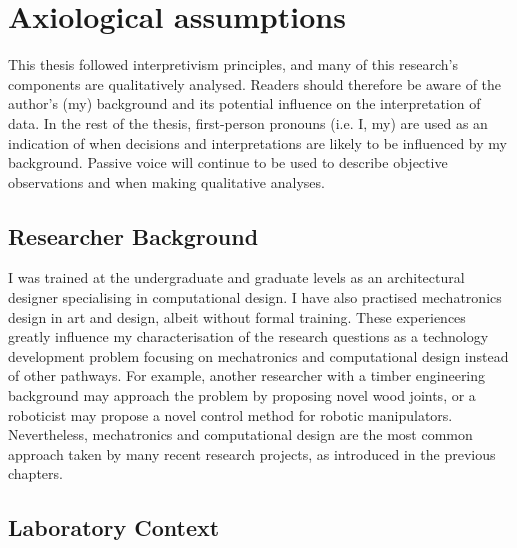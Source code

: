 \section{Axiological assumptions}
\label{section:methodology_axiological_assumptions}

This thesis followed interpretivism principles, and many of this research's components are qualitatively analysed. Readers should therefore be aware of the author’s (my) background and its potential influence on the interpretation of data. In the rest of the thesis, first-person pronouns (i.e. I, my) are used as an indication of when decisions and interpretations are likely to be influenced by my background. Passive voice will continue to be used to describe objective observations and when making qualitative analyses.

\subsection{Researcher Background}
\label{subsection:methodology_researcher_background}

I was trained at the undergraduate and graduate levels as an architectural designer specialising in computational design. I have also practised mechatronics design in art and design, albeit without formal training. These experiences greatly influence my characterisation of the research questions as a technology development problem focusing on mechatronics and computational design instead of other pathways. For example, another researcher with a timber engineering background may approach the problem by proposing novel wood joints, or a roboticist may propose a novel control method for robotic manipulators. Nevertheless, mechatronics and computational design are the most common approach taken by many recent research projects, as introduced in the previous chapters.

\subsection{Laboratory Context}
\label{subsection:methodology_laboratory_context}

